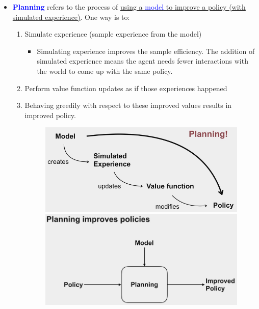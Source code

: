 \documentclass[12pt, a4paper]{article}
\begin{document}
\begin{itemize}
  \item \textbf{\textcolor{blue}{Planning}} refers to the process of \uline{using a \textcolor{blue}{model} to improve a policy (with simulated experience)}. One way is to:
  \begin{enumerate}
    \item Simulate experience (sample experience from the model)
    \begin{itemize}
      \item Simulating experience improves the sample efficiency. The addition of simulated experience means the agent needs fewer interactions with the world to come up with the same policy.
    \end{itemize}
    \item Perform value function updates as if those experiences happened
    \item Behaving greedily with respect to these improved values results in improved policy.
    \begin{figure}[H]
      \centering
        \includegraphics[width=0.8\columnwidth]{images/planning.png}
        \includegraphics[width=0.8\columnwidth]{images/planning2.png}
        \label{fig:planning}
    \end{figure}
  \end{enumerate}
\end{itemize}
\end{document}
